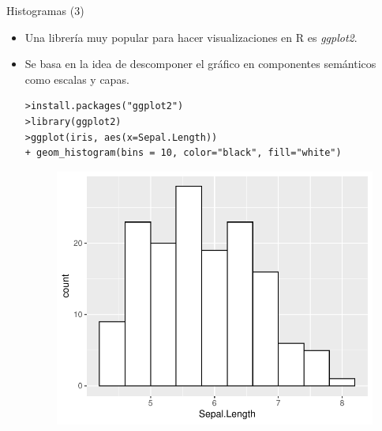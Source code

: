 \documentclass[handout]{beamer}
\begin{document}
\begin{frame}[fragile]{Histogramas (3) }
\scriptsize{
\begin{itemize}
 \item Una librería muy popular para hacer visualizaciones en R es \emph{ggplot2}.
 \item Se basa en la idea de descomponer el gráfico en componentes semánticos como escalas y capas.
 
 \begin{verbatim}
>install.packages("ggplot2")
>library(ggplot2)
>ggplot(iris, aes(x=Sepal.Length)) 
+ geom_histogram(bins = 10, color="black", fill="white")
 \end{verbatim}
 \begin{figure}[h!]
	\centering
	\includegraphics[scale=0.4]{imagenes/hist3.pdf}
	
	
\end{figure} 

\end{itemize}

}
\end{frame}
\end{document}

